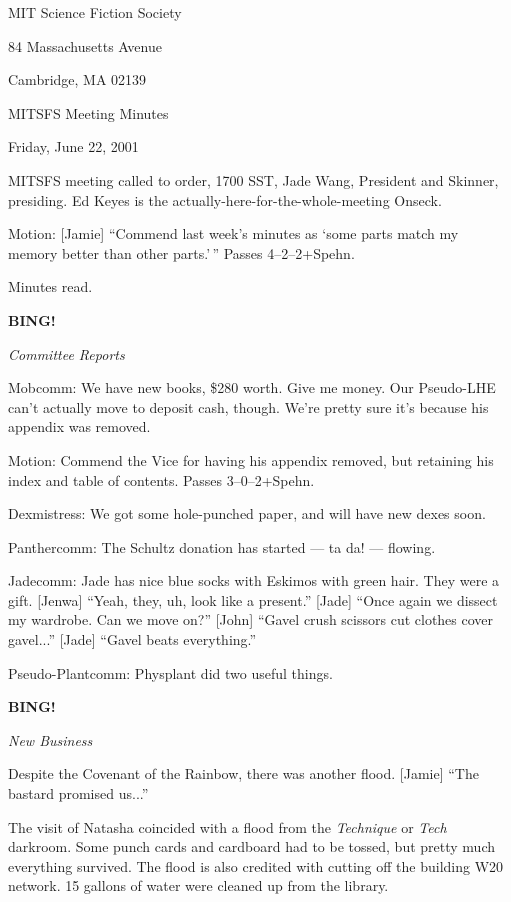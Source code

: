\documentclass[12pt]{article}
\newcommand{\bing}{{\bf BING!} }
\newcommand{\goto}[1]{\bing \vskip 12pt \centerline{{\em{#1}}}}
\begin{document}
\begin{center}

MIT Science Fiction Society 

84 Massachusetts Avenue

Cambridge, MA 02139

\vspace{12pt}

MITSFS Meeting Minutes 

Friday, June 22, 2001

\end{center}
 
\vspace{18pt}

\setlength{\parskip}{6pt}

\noindent
MITSFS meeting called to order, 1700 SST, Jade Wang, President and
Skinner, presiding.  Ed Keyes is the actually-here-for-the-whole-meeting
Onseck.

Motion: [Jamie] ``Commend last week's minutes as `some parts match my
memory better than other parts.'\,''  Passes 4--2--2+Spehn.

Minutes read.

\goto{Committee Reports}

Mobcomm: We have new books, \$280 worth.  Give me money.  Our Pseudo-LHE
can't actually move to deposit cash, though.  We're pretty sure it's
because his appendix was removed.

Motion: Commend the Vice for having his appendix removed, but retaining
his index and table of contents.  Passes 3--0--2+Spehn.

Dexmistress: We got some hole-punched paper, and will have new dexes soon.

Panthercomm: The Schultz donation has started --- ta da! --- flowing.

Jadecomm: Jade has nice blue socks with Eskimos with green hair.
They were a gift.  [Jenwa] ``Yeah, they, uh, look like a present.''
[Jade] ``Once again we dissect my wardrobe.  Can we move on?''
[John] ``Gavel crush scissors cut clothes cover gavel...''  [Jade]
``Gavel beats everything.''

Pseudo-Plantcomm: Physplant did two useful things.

\goto{New Business}

Despite the Covenant of the Rainbow, there was another flood.
[Jamie] ``The bastard promised us...''

The visit of Natasha coincided with a flood from the {\em Technique} or
{\em Tech} darkroom.  Some punch cards and cardboard had to be tossed, but
pretty much everything survived.  The flood is also credited with
cutting off the building W20 network.  15 gallons of water were
cleaned up from the library.
\end{document}
